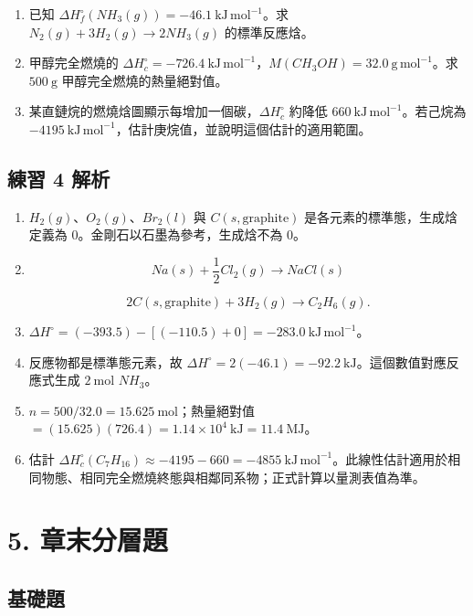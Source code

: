 \documentclass[11pt,a4paper]{article}
\providecommand{\tightlist}{%
  \setlength{\itemsep}{0pt}\setlength{\parskip}{0pt}}
\begin{document}
\begin{enumerate}
\def\labelenumi{\arabic{enumi}.}
\setcounter{enumi}{3}
\tightlist
\item
  已知 \(\Delta H_f^\circ(NH_3(g))=-46.1\ \mathrm{kJ\,mol^{-1}}\)。求 \(N_2(g)+3H_2(g)\rightarrow2NH_3(g)\) 的標準反應焓。
\item
  甲醇完全燃燒的 \(\Delta H_c^\circ=-726.4\ \mathrm{kJ\,mol^{-1}}\)，\(M(CH_3OH)=32.0\ \mathrm{g\,mol^{-1}}\)。求 \(500\ \mathrm g\) 甲醇完全燃燒的熱量絕對值。
\item
  某直鏈烷的燃燒焓圖顯示每增加一個碳，\(\Delta H_c^\circ\) 約降低 \(660\ \mathrm{kJ\,mol^{-1}}\)。若己烷為 \(-4195\ \mathrm{kJ\,mol^{-1}}\)，估計庚烷值，並說明這個估計的適用範圍。
\end{enumerate}

\subsection{練習 4 解析}\label{ux7df4ux7fd2-4-ux89e3ux6790}

\begin{enumerate}
\def\labelenumi{\arabic{enumi}.}
\item
  \(H_2(g)\)、\(O_2(g)\)、\(Br_2(l)\) 與 \(C(s,\mathrm{graphite})\) 是各元素的標準態，生成焓定義為 0。金剛石以石墨為參考，生成焓不為 0。
\item
  \[
   Na(s)+\frac12Cl_2(g)\rightarrow NaCl(s)
   \]

  \[
   2C(s,\mathrm{graphite})+3H_2(g)\rightarrow C_2H_6(g).
   \]
\item
  \(\Delta H^\circ=(-393.5)-[(-110.5)+0]=-283.0\ \mathrm{kJ\,mol^{-1}}\)。
\item
  反應物都是標準態元素，故 \(\Delta H^\circ=2(-46.1)=-92.2\ \mathrm{kJ}\)。這個數值對應反應式生成 \(2\ \mathrm{mol}\) \(NH_3\)。
\item
  \(n=500/32.0=15.625\ \mathrm{mol}\)；熱量絕對值 \(=(15.625)(726.4)=1.14\times10^4\ \mathrm{kJ}=11.4\ \mathrm{MJ}\)。
\item
  估計 \(\Delta H_c^\circ(C_7H_{16})\approx-4195-660=-4855\ \mathrm{kJ\,mol^{-1}}\)。此線性估計適用於相同物態、相同完全燃燒終態與相鄰同系物；正式計算以量測表值為準。
\end{enumerate}

\section{5. 章末分層題}\label{ux7ae0ux672bux5206ux5c64ux984c}

\subsection{基礎題}\label{ux57faux790eux984c}
\end{document}
